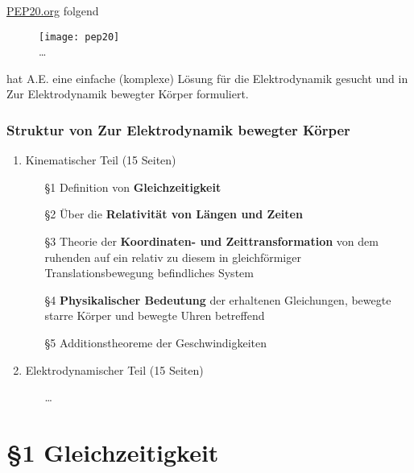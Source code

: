 \documentclass[]{beamer}%
\begin{document}
\begin{frame}
	\href{https://pep20.org/}{PEP20.org} folgend 
    \begin{figure}[h]
            \centering
            \texttt{[image: pep20]}\\
            \dots
    \end{figure}
    hat A.E. eine einfache (komplexe) 
    Lösung für die Elektrodynamik gesucht und in
    \glqq Zur Elektrodynamik bewegter Körper\grqq{} formuliert.
\end{frame}

\begin{frame}
    \frametitle{Struktur von \glqq{} Zur Elektrodynamik bewegter Körper \grqq{}}
    \begin{enumerate}[I]
        \item Kinematischer Teil (15 Seiten)
        \begin{itemize}
			\item[§1]   Definition von \textbf{Gleichzeitigkeit}
			\item[§2]   Über die \textbf{Relativität von Längen und Zeiten}
			\item[§3]   Theorie der \textbf{Koordinaten- und Zeittransformation} von dem ruhenden
                        auf ein relativ zu diesem in gleichförmiger Translationsbewegung 
                        befindliches System
			\item[§4]   \textbf{Physikalischer Bedeutung} der erhaltenen Gleichungen, 
                        bewegte starre Körper und bewegte Uhren betreffend
			\item[§5]   Additionstheoreme der Geschwindigkeiten
		\end{itemize}
        \vspace{10pt}
		\item Elektrodynamischer Teil (15 Seiten)
        \begin{itemize}
            \item[]\dots
        \end{itemize}
	\end{enumerate}
\end{frame}
\section{§1 Gleichzeitigkeit}

\begin{frame}
\end{frame}
\end{document}
